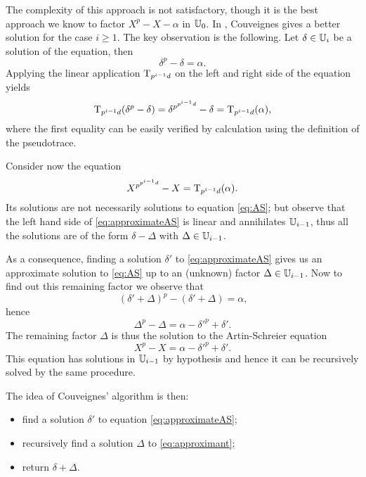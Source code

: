 The complexity of this approach is not satisfactory, though it is the
best approach we know to factor $X^p-X-\alpha$ in $\mathbb{U}_0$. In
\cite{Cou00}, Couveignes gives a better solution for the case
$i\ge1$. The key observation is the following. Let $\delta\in\mathbb{U}_i$ be
a solution of the equation, then
\[\delta^p - \delta = \alpha\text{.}\]
Applying the linear application $\operatorname{T}_{p^{i-1}d}$ on the left and
right side of the equation yields
\begin{equation*}
  \operatorname{T}_{p^{i-1}d}(\delta^p-\delta) = \delta^{p^{p^{i-1}d}} - \delta =
  \operatorname{T}_{p^{i-1}d}(\alpha)
  \text{,}
\end{equation*}
where the first equality can be easily verified by calculation using
the definition of the pseudotrace.

Consider now the equation
\begin{equation}
  \label{eq:approximateAS}
  X^{p^{p^{i-1}d}} - X = \operatorname{T}_{p^{i-1}d}(\alpha)
  \text{.}
\end{equation}
Its solutions are not necessarily solutions to equation \eqref{eq:AS};
but observe that the left hand side of \eqref{eq:approximateAS} is
linear and annihilates $\mathbb{U}_{i-1}$, thus all the solutions are of the
form $\delta - \Delta$ with $\Delta\in\mathbb{U}_{i-1}$.

As a consequence, finding a solution $\delta'$ to
\eqref{eq:approximateAS} gives us an approximate solution to
\eqref{eq:AS} up to an (unknown) factor $\Delta\in\mathbb{U}_{i-1}$. Now to
find out this remaining factor we observe that
\begin{equation*}
  (\delta' + \Delta)^p - (\delta'+\Delta) = \alpha
  \text{,}
\end{equation*}
hence
\begin{equation*}
  \Delta^p - \Delta = \alpha - \delta'^p + \delta'
  \text{.}
\end{equation*}
The remaining factor $\Delta$ is thus the solution to the
Artin-Schreier equation
\begin{equation}
  \label{eq:approximant}
  X^p-X=\alpha-\delta'^p+\delta'
  \text{.}
\end{equation}
This equation has solutions in $\mathbb{U}_{i-1}$ by hypothesis and hence it
can be recursively solved by the same procedure.

The idea of Couveignes' algorithm is then:
\begin{itemize}
\item find a solution $\delta'$ to equation \eqref{eq:approximateAS};
\item recursively find a solution $\Delta$ to \eqref{eq:approximant};
\item return $\delta+\Delta$.
\end{itemize}

